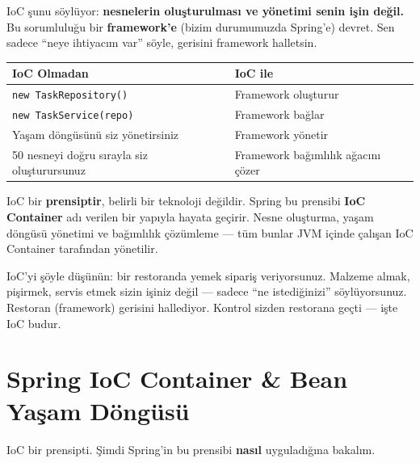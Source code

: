 \documentclass[11pt,a4paper]{article}
\begin{document}
IoC \c{s}unu s\"{o}yl\"{u}yor: \textbf{nesnelerin olu\c{s}turulmas{\i} ve y\"{o}netimi senin i\c{s}in de\u{g}il.} Bu sorumlulu\u{g}u bir \textbf{framework'e} (bizim durumumuzda Spring'e) devret. Sen sadece ``neye ihtiyac{\i}m var'' s\"{o}yle, gerisini framework halletsin.

\begin{center}
\begin{tabular}{p{6cm}p{6.5cm}}
\toprule
\textbf{IoC Olmadan} & \textbf{IoC ile} \\
\midrule
\texttt{new TaskRepository()} & Framework olu\c{s}turur \\
\texttt{new TaskService(repo)} & Framework ba\u{g}lar \\
Ya\c{s}am d\"{o}ng\"{u}s\"{u}n\"{u} siz y\"{o}netirsiniz & Framework y\"{o}netir \\
50 nesneyi do\u{g}ru s{\i}rayla siz olu\c{s}turursunuz & Framework ba\u{g}{\i}ml{\i}l{\i}k a\u{g}ac{\i}n{\i} \c{c}\"{o}zer \\
\bottomrule
\end{tabular}
\end{center}

IoC bir \textbf{prensiptir}, belirli bir teknoloji de\u{g}ildir. Spring bu prensibi \textbf{IoC Container} ad{\i} verilen bir yap{\i}yla hayata ge\c{c}irir. Nesne olu\c{s}turma, ya\c{s}am d\"{o}ng\"{u}s\"{u} y\"{o}netimi ve ba\u{g}{\i}ml{\i}l{\i}k \c{c}\"{o}z\"{u}mleme --- t\"{u}m bunlar JVM i\c{c}inde \c{c}al{\i}\c{s}an IoC Container taraf{\i}ndan y\"{o}netilir.

\begin{tipbox}
IoC'yi \c{s}\"{o}yle d\"{u}\c{s}\"{u}n\"{u}n: bir restoranda yemek sipari\c{s} veriyorsunuz. Malzeme almak, pi\c{s}irmek, servis etmek sizin i\c{s}iniz de\u{g}il --- sadece ``ne istedi\u{g}inizi'' s\"{o}yl\"{u}yorsunuz. Restoran (framework) gerisini hallediyor. Kontrol sizden restorana ge\c{c}ti --- i\c{s}te IoC budur.
\end{tipbox}

\newpage

\section{Spring IoC Container \& Bean Ya\c{s}am D\"{o}ng\"{u}s\"{u}}

IoC bir prensipti. \c{S}imdi Spring'in bu prensibi \textbf{nas{\i}l} uygulad{\i}\u{g}{\i}na bakal{\i}m.
\end{document}
